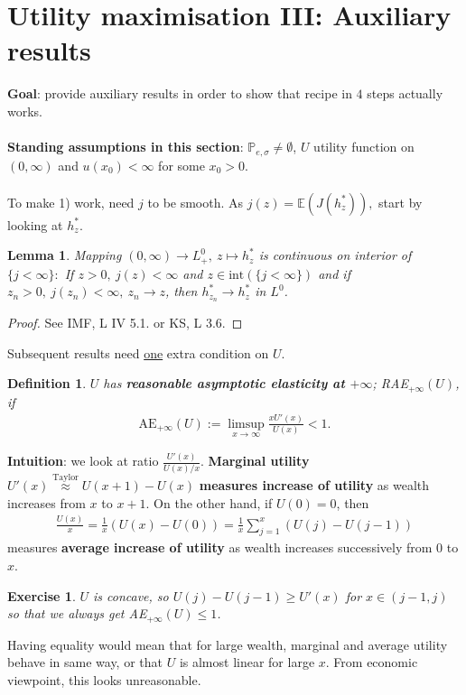 \documentclass[12pt,a4paper, twoside]{article}
\newtheorem{lem}{Lemma}[section]
\newtheorem{defn}{Definition}[section]
\newtheorem{exe}{Exercise}[section]
\theoremstyle{definition}
\newcommand{\EE}{\mathbb{E}} %
\newcommand{\PP}{\mathbb{P}} %
\begin{document}
\section{Utility maximisation III: Auxiliary results}
\textbf{Goal}: provide auxiliary results in order to show that recipe in $4$ steps actually works. 
\\\\
\textbf{Standing assumptions in this section}: $\PP_{e, \sigma} \neq \emptyset$, $U$ utility function on $(0, \infty)$ and $u(x_0) < \infty$ for some $x_0 >0$.\\
\\
To make 1) work, need $j$ to be smooth. As $j(z)= \EE(J(h_z^*)),$ start by looking at $h_z^*$. 
\begin{lem} \label{L121} Mapping $(0, \infty) \to L_+^0, \ z \mapsto h_z^*$ is continuous on interior of \\ $\{j < \infty\}:$ If $z >0, \ j(z) < \infty$ and $z \in \text{int}(\{j < \infty\})$ and if $z_n >0, \ j(z_n) < \infty, \ z_n \to z$, then $h_{z_n}^* \to h_z^*$ in $L^0$. 
\end{lem}
\begin{proof}
See IMF, L IV 5.1. or KS, L 3.6.
\end{proof}
Subsequent results need \underline{one} extra condition on $U$. 
\begin{defn} $U$ has \textbf{reasonable asymptotic elasticity at $+ \infty$}; RAE$_{+ \infty}(U)$, if 
\begin{align*}
\text{AE}_{+ \infty}(U):= \limsup_{x \to \infty} \frac{x U'(x)}{U(x)}<1.
\end{align*}
\end{defn}
\noindent \textbf{Intuition}: we look at ratio  $\frac{U'(x)}{U(x)/x}$. \textbf{Marginal utility} $U'(x) \overset{\text{Taylor}}\approx U(x+1)-U(x)$ \textbf{measures increase of utility} as wealth increases from $x$ to $x+1$. On the other hand, if $U(0)=0$, then 
\begin{align*}
\frac{U(x)}{x} = \frac{1}{x}(U(x)-U(0)) = \frac{1}{x} \sum_{j=1}^x (U(j)-U(j-1))
\end{align*}
measures \textbf{average increase of utility} as wealth increases successively from $0$ to $x$. \begin{exe} \label{ex21} $U$ is concave, so $U(j)-U(j-1) \geq U'(x)$ for $x \in (j-1,j)$ so that we always get AE$_{+ \infty}(U) \leq 1$.
\end{exe}
Having equality would mean that for large wealth, marginal and average utility behave in same way, or that $U$ is almost linear for large $x$. From economic viewpoint, this looks unreasonable. 
\end{document}
